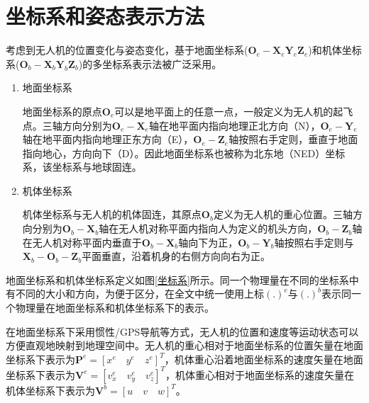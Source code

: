 \section{坐标系和姿态表示方法}

考虑到无人机的位置变化与姿态变化，基于地面坐标系($\boldsymbol{O}_e-\boldsymbol{X}_e\boldsymbol{Y}_e\boldsymbol{Z}_e $)和机体坐标系(${\boldsymbol{O}_b}-{\boldsymbol{X}_b}{\boldsymbol{Y}_b}{\boldsymbol{Z}_b}$)的多坐标系表示法被广泛采用。

\begin{enumerate}[topsep = 0 pt, itemsep= 0 pt, parsep=0pt, partopsep=0pt, leftmargin=44pt, itemindent=0pt, labelsep=6pt, label=(\arabic*)]
	\item 地面坐标系

    地面坐标系的原点$\boldsymbol{O}_e$可以是地平面上的任意一点，一般定义为无人机的起飞点。三轴方向分别为$\boldsymbol{O}_e-\boldsymbol{X}_e$轴在地平面内指向地理正北方向（N），$\boldsymbol{O}_e-\boldsymbol{Y}_e$轴在地平面内指向地理正东方向（E），$\boldsymbol{O}_e-\boldsymbol{Z}_e$轴按照右手定则，垂直于地面指向地心，方向向下（D）。因此地面坐标系也被称为北东地（NED）坐标系，该坐标系与地球固连。

	\item 机体坐标系
	
    机体坐标系与无人机的机体固连，其原点$\boldsymbol{O}_b$定义为无人机的重心位置。三轴方向分别为$\boldsymbol{O}_b-\boldsymbol{X}_b$轴在无人机对称平面内指向人为定义的机头方向，$\boldsymbol{O}_b-\boldsymbol{Z}_b$轴在无人机对称平面内垂直于$\boldsymbol{O}_b-\boldsymbol{X}_b$轴向下为正，$\boldsymbol{O}_b-\boldsymbol{Y}_b$轴按照右手定则与$\boldsymbol{X}_b-\boldsymbol{O}_b-\boldsymbol{Z}_b$平面垂直，沿着机身的右侧方向向右为正。
\end{enumerate}

地面坐标系和机体坐标系定义如图\ref{坐标系}所示。同一个物理量在不同的坐标系中有不同的大小和方向，为便于区分，在全文中统一使用上标$(.)^{e}$与$(.)^{b}$表示同一个物理量在地面坐标系和机体坐标系下的表示。

在地面坐标系下采用惯性/GPS导航等方式，无人机的位置和速度等运动状态可以方便直观地映射到地理空间中。无人机的重心相对于地面坐标系的位置矢量在地面坐标系下表示为$\boldsymbol{P}^{e}=[{x}^{e} \quad {y}^{e} \quad {z}^{e}]^{T}$，机体重心沿着地面坐标系的速度矢量在地面坐标系下表示为$\boldsymbol{V}^{e}=[{v}^{e}_{x} \quad {v}^{e}_{y} \quad {v}^{e}_{z}]^{T}$，机体重心相对于地面坐标系的速度矢量在机体坐标系下表示为$\boldsymbol{V}^{b}=[{u} \quad {v} \quad {w}]^{T}$。

